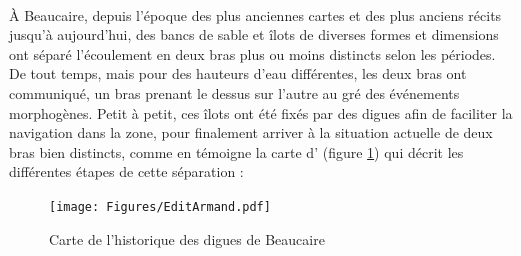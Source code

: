 \documentclass[11pt]{article}
\begin{document}
        \paragraph{} À Beaucaire, depuis l'époque des plus anciennes cartes et des plus anciens récits jusqu'à aujourd'hui, des bancs de sable et îlots de diverses formes et dimensions ont séparé l'écoulement en deux bras plus ou moins distincts selon les périodes. De tout temps, mais pour des hauteurs d'eau différentes, les deux bras ont communiqué, un bras prenant le dessus sur l'autre au gré des événements morphogènes. Petit à petit, ces îlots ont été fixés par des digues afin de faciliter la navigation dans la zone, pour finalement arriver à la situation actuelle de deux bras bien distincts, comme en témoigne la carte d'\citet{armand_ii_1907} (figure \ref{fig:DigArmand}) qui décrit les différentes étapes de cette séparation :
        
         \begin{figure}[h]
            \centering
            \texttt{[image: Figures/EditArmand.pdf]}
            \caption{Carte de l'historique des digues de Beaucaire \citep{armand_ii_1907}}
            \label{fig:DigArmand}
        \end{figure}
        
\end{document}
